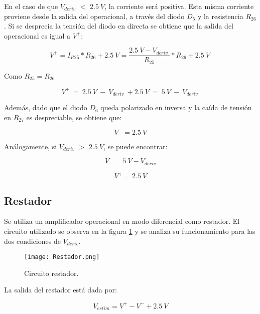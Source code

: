 En el caso de que $V_{deriv}$ $\mathrm{<}$ $2.5\:V$, la corriente será positiva. Esta misma corriente proviene desde la salida del operacional, a través del diodo $D_5$ y la resistencia $R_{26}$. Si se desprecia la tensión del diodo en directa se obtiene que la salida del operacional es igual a $V^+$:

\begin{equation} 
	V^+=I_{R25}*R_{26}+2.5\:V=\frac{2.5\:V-V_{deriv}\ }{R_{25}}*R_{26}+2.5\:V\ 
\end{equation} 

Como $R_{25}=R_{26}$

\begin{equation} \label{eq_V+}
	V^+\ =\ 2.5\:V\ -\ V_{deriv}\ +2.5\:V\ =\ 5\:V\ -\ V_{deriv}\ 
\end{equation}

Además, dado que el diodo $D_6$ queda polarizado en inversa y la caída de tensión en $R_{27}$ es despreciable, se obtiene que:
 
 \begin{equation} \label{eq_V-}
 	V^- = 2.5\:V 
 \end{equation}

Análogamente, si $V_{deriv}$ $\mathrm{>}$ $2.5\:V$, se puede encontrar:

\begin{equation} \label{eq_V-_2}
	V^- =5\:V-V_{deriv} 
\end{equation}

\begin{equation}  \label{eq_V+_2}
	V^+ = 2.5\:V
\end{equation}


\subsection{Restador}

Se utiliza un amplificador operacional en modo diferencial como restador. El circuito utilizado se observa en la figura \ref{fig:img_Restador} y se analiza su funcionamiento para las dos condiciones de $V_{deriv}$.

\begin{figure}[H]
	\centering
	\texttt{[image: Restador.png]}
	\caption{Circuito restador.}
	\label{fig:img_Restador}
\end{figure}

La salida del restador está dada por:

\begin{equation} \label{eq_salida_restador}
		V_{estim}=V^+-V^-+2.5\:V
\end{equation}

